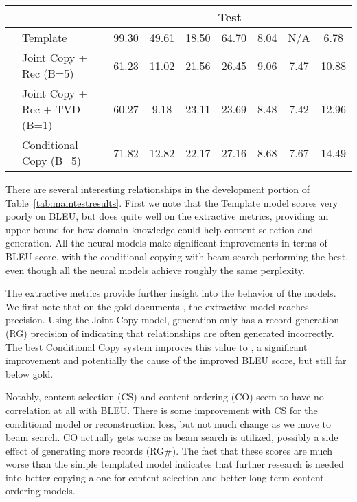 \documentclass[11pt,letterpaper]{article}
\begin{document}
\begin{table*}
\begin{tabular}{llccccccc}
  & & \multicolumn{7}{c}{Test} \\
\midrule
&Template                 & 99.30 & 49.61 & 18.50 & 64.70 & 8.04 & N/A  & 6.78   \\
&Joint Copy + Rec (B=5)      & 61.23 & 11.02 & 21.56 & 26.45 & 9.06 & 7.47 & 10.88 \\
&Joint Copy + Rec + TVD (B=1) & 60.27 & 9.18  & 23.11 & 23.69 & 8.48 & 7.42 & 12.96 \\
&Conditional Copy (B=5)            & 71.82 & 12.82 & 22.17 & 27.16 & 8.68 & 7.67 & 14.49 \\
\bottomrule
\end{tabular}
\caption{Performance of induced metrics on gold and system outputs of RotoWire development and test data. 
  Columns indicate Record Generation (RG) precision and count, Content Selection (CS) precision and recall, 
  Count Ordering (CO) in normalized Damerau-Levenshtein distance, perplexity, and BLEU. These first three metrics are described in Section~\ref{sec:comparing}. Models compare Joint and Conditional 
  Copy also with addition Reconstruction loss and Total Variation Distance extensions (described in Section~\ref{sec:models}).
}
\label{tab:maintestresults}
\end{table*} 
 
There are several interesting relationships in the development portion of Table~\ref{tab:maintestresults}.
First we note that the Template model scores very poorly on BLEU, but
does quite well on the extractive metrics, providing an upper-bound
for how domain knowledge could help content selection and
generation. All the neural models make significant improvements in terms
of BLEU score, with the conditional copying with beam search
performing the best, even though all the neural models achieve roughly
the same perplexity.

The extractive metrics provide further insight into the behavior of
the models. We first note that on the gold documents , the extractive model reaches
 precision. Using the Joint Copy model, generation only
has a record generation (RG) precision of  indicating that
relationships are often generated incorrectly. The best Conditional
Copy system improves this value to , a significant improvement
and potentially the cause of the improved BLEU score, but still far below
gold. 

Notably, content selection (CS) and content ordering (CO) seem to have
no correlation at all with BLEU. There is some improvement with CS for
the conditional model or reconstruction loss, but not much change as
we move to beam search. CO actually gets worse as beam search is
utilized, possibly a side effect of generating more records (RG\#). 
The fact that these scores are much worse than the simple templated model
indicates that further research is needed into better copying alone for 
content selection and better long term content ordering models. 
\end{document}
